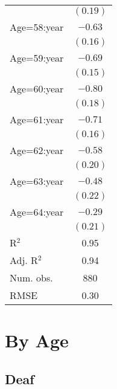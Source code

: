 \documentclass[fullpage]{paper}
\begin{document}
\begin{center}
\begin{longtable}{l c }
            & $(0.19)$ \\
Age=58:year & $-0.63$  \\
            & $(0.16)$ \\
Age=59:year & $-0.69$  \\
            & $(0.15)$ \\
Age=60:year & $-0.80$  \\
            & $(0.18)$ \\
Age=61:year & $-0.71$  \\
            & $(0.16)$ \\
Age=62:year & $-0.58$  \\
            & $(0.20)$ \\
Age=63:year & $-0.48$  \\
            & $(0.22)$ \\
Age=64:year & $-0.29$  \\
            & $(0.21)$ \\
\hline
R$^2$       & 0.95     \\
Adj. R$^2$  & 0.94     \\
Num. obs.   & 880      \\
RMSE        & 0.30     \\
\end{longtable}
\end{center}
\section{ By Age }

\subsection{ Deaf }
\end{document}
